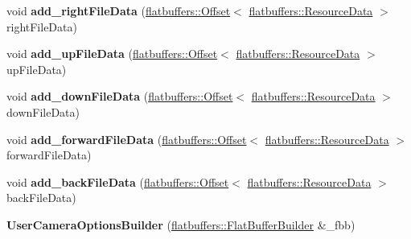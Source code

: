 \begin{DoxyCompactItemize}
\item 
\mbox{\label{structflatbuffers_1_1UserCameraOptionsBuilder_a05e2f0e8fb920c61e58797e36d09f7a4}} 
void {\bfseries add\+\_\+right\+File\+Data} (\hyperlink{structflatbuffers_1_1Offset}{flatbuffers\+::\+Offset}$<$ \hyperlink{structflatbuffers_1_1ResourceData}{flatbuffers\+::\+Resource\+Data} $>$ right\+File\+Data)
\item 
\mbox{\label{structflatbuffers_1_1UserCameraOptionsBuilder_a6aa0ee0c367540b387fe6a1b54c88bcc}} 
void {\bfseries add\+\_\+up\+File\+Data} (\hyperlink{structflatbuffers_1_1Offset}{flatbuffers\+::\+Offset}$<$ \hyperlink{structflatbuffers_1_1ResourceData}{flatbuffers\+::\+Resource\+Data} $>$ up\+File\+Data)
\item 
\mbox{\label{structflatbuffers_1_1UserCameraOptionsBuilder_a1585368fddad5d794145206aea2d1f6c}} 
void {\bfseries add\+\_\+down\+File\+Data} (\hyperlink{structflatbuffers_1_1Offset}{flatbuffers\+::\+Offset}$<$ \hyperlink{structflatbuffers_1_1ResourceData}{flatbuffers\+::\+Resource\+Data} $>$ down\+File\+Data)
\item 
\mbox{\label{structflatbuffers_1_1UserCameraOptionsBuilder_abe546f168ccc56ac435809b62c0085aa}} 
void {\bfseries add\+\_\+forward\+File\+Data} (\hyperlink{structflatbuffers_1_1Offset}{flatbuffers\+::\+Offset}$<$ \hyperlink{structflatbuffers_1_1ResourceData}{flatbuffers\+::\+Resource\+Data} $>$ forward\+File\+Data)
\item 
\mbox{\label{structflatbuffers_1_1UserCameraOptionsBuilder_a869f420aea925a0ee3d10e3efa9bd0a3}} 
void {\bfseries add\+\_\+back\+File\+Data} (\hyperlink{structflatbuffers_1_1Offset}{flatbuffers\+::\+Offset}$<$ \hyperlink{structflatbuffers_1_1ResourceData}{flatbuffers\+::\+Resource\+Data} $>$ back\+File\+Data)
\item 
\mbox{\label{structflatbuffers_1_1UserCameraOptionsBuilder_a0791d72b12865be6a1c61c5e102d3509}} 
{\bfseries User\+Camera\+Options\+Builder} (\hyperlink{classflatbuffers_1_1FlatBufferBuilder}{flatbuffers\+::\+Flat\+Buffer\+Builder} \&\+\_\+fbb)

\end{DoxyCompactItemize}
